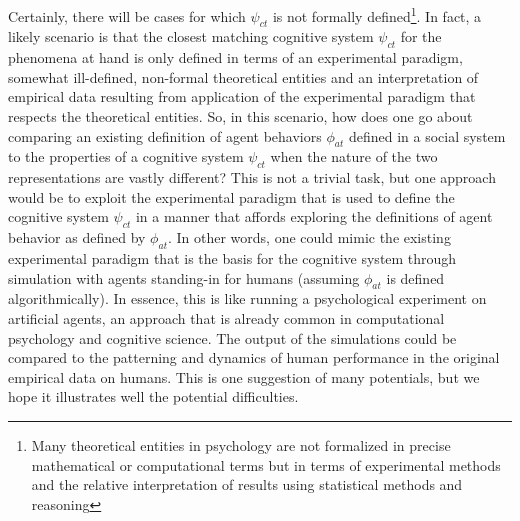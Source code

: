 \documentclass{article}
\begin{document}
Certainly, there will be cases for which $\psi_{ct}$ is not formally defined\footnote{Many theoretical entities in psychology are not formalized in precise mathematical or computational terms but in terms of experimental methods and the relative interpretation of results using statistical methods and reasoning}.  In fact, a likely scenario is that the closest matching cognitive system $\psi_{ct}$ for the phenomena at hand is only defined in terms of an experimental paradigm, somewhat ill-defined, non-formal theoretical entities and an interpretation of empirical data resulting from application of the experimental paradigm that respects the theoretical entities.  So, in this scenario, how does one go about comparing an existing definition of agent behaviors $\phi_{at}$ defined in a social system to the properties of a cognitive system $\psi_{ct}$ when the nature of the two representations are vastly different?  This is not a trivial task, but one approach would be to exploit the experimental paradigm that is used to define the cognitive system $\psi_{ct}$ in a manner that affords exploring the definitions of agent behavior as defined by $\phi_{at}$.  In other words, one could mimic the existing experimental paradigm that is the basis for the cognitive system through simulation with agents standing-in for humans (assuming $\phi_{at}$ is defined algorithmically).  In essence, this is like running a psychological experiment on artificial agents, an approach that is already common in computational psychology and cognitive science.  The output of the simulations could be compared to the patterning and dynamics of human performance in the original  empirical data on humans.  This is one suggestion of many potentials, but we hope it illustrates well the potential difficulties.  

  
\end{document}
